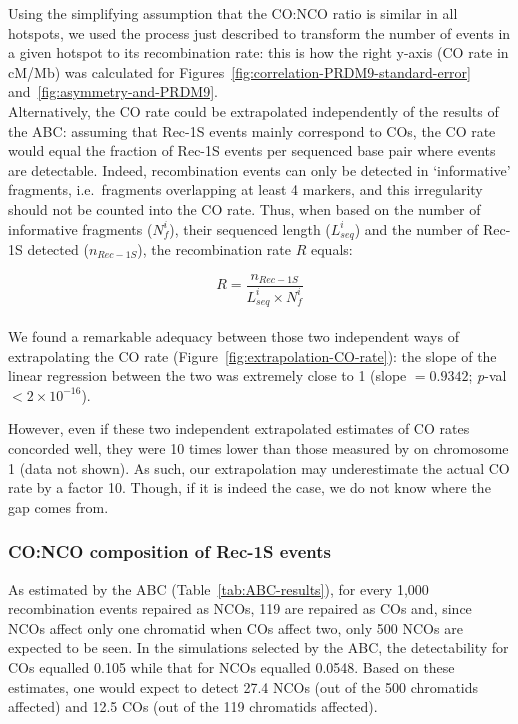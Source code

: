 Using the simplifying assumption that the CO:NCO ratio is similar in all hotspots, we used the process just described to transform the number of events in a given hotspot to its recombination rate: this is how the right y-axis (CO rate in cM/Mb) was calculated for Figures~\ref{fig:correlation-PRDM9-standard-error} and~\ref{fig:asymmetry-and-PRDM9}.\\

Alternatively, the CO rate could be extrapolated independently of the results of the ABC\@: assuming that Rec-1S events mainly correspond to COs, the CO rate would equal the fraction of Rec-1S events per sequenced base pair where events are detectable.
Indeed, recombination events can only be detected in ‘informative’ fragments, i.e.\ fragments overlapping at least 4 markers, and this irregularity should not be counted into the CO rate.
Thus, when based on the number of informative fragments ($N^{i}_{f}$), their sequenced length ($L^{i}_{seq}$) and the number of Rec-1S detected ($n_{Rec-1S}$), the recombination rate $R$ equals:

\begin{equation*}
    R = \frac{n_{Rec-1S}}{L^{i}_{seq} \times N^{i}_{f}}
\end{equation*}\\



We found a remarkable adequacy between those two independent ways of extrapolating the CO rate (Figure~\ref{fig:extrapolation-CO-rate}): the slope of the linear regression between the two was extremely close to 1 (slope $ =0.9342$; \textit{p}-val $< 2 \times 10^{-16}$).


However, even if these two independent extrapolated estimates of CO rates concorded well, they were 10 times lower than those measured by \citet{paigen2008recombinational} on chromosome 1 (data not shown). 
As such, our extrapolation may underestimate the actual CO rate by a factor 10. Though, if it is indeed the case, we do not know where the gap comes from.






\subsubsection{CO:NCO composition of Rec-1S events}

As estimated by the ABC (Table~\ref{tab:ABC-results}), for every 1,000 recombination events repaired as NCOs, 119 are repaired as COs and, since NCOs affect only one chromatid when COs affect two, only 500 NCOs are expected to be seen. 
In the simulations selected by the ABC, the detectability for COs equalled 0.105 while that for NCOs equalled 0.0548. 
Based on these estimates, one would expect to detect 27.4 NCOs (out of the 500 chromatids affected) and 12.5 COs (out of the 119 chromatids affected).


